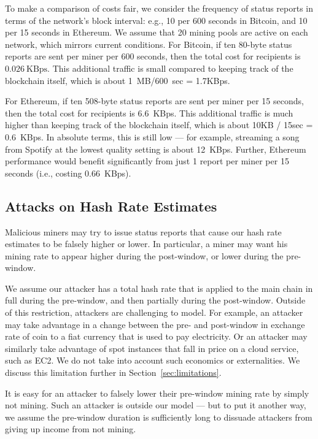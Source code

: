 \documentclass[10pt,sigconf]{acmart}
\newcommand{\para }[1]{\smallskip \noindent {\bf #1}}
\newcommand{\1}{{\em (i)}}
\newcommand{\2}{{\em (ii)}}
\newcommand{\3}{{\em (iii)}}
\newcommand{\4}{{\em (iv)}}
\newcommand{\5}{{\em (v)}}
\begin{document}
To make a comparison  of costs fair, we consider the frequency of status reports in terms of the network's block interval: e.g., 10 per 600 seconds in Bitcoin, and 10 per 15 seconds in Ethereum. We assume that 20 mining pools are active on each network, which mirrors current conditions. For Bitcoin, if ten 80-byte status reports are sent per miner per 600 seconds, then the total cost for recipients is 
$0.026~\mbox{KBps}$. This additional traffic is small compared to keeping track of the blockchain itself, which is about 1~MB/600~sec = 1.7KBps.

For Ethereum, if ten 508-byte status reports are sent per miner per 15 seconds, then the total cost for recipients is 6.6~KBps.  This additional traffic is much higher  than  keeping track of the blockchain itself, which is about 10KB / 15sec = 0.6~KBps. In absolute terms, this is still low --- for example, streaming a song from Spotify at the lowest quality setting is about 12~KBps. Further, Ethereum performance would benefit significantly from just 1 report per miner per 15 seconds (i.e., costing 0.66~KBps).


\subsection{Attacks on Hash Rate Estimates}
\label{sec:attacks-on}
Malicious miners may try to issue status reports that cause our hash rate estimates to be falsely higher or lower. 
In particular, a miner may want his mining rate to appear higher during the post-window, or lower during the pre-window. 


\para{Attacker Model.} We assume our attacker has a total hash rate that is applied to the main chain in full during the pre-window, and then partially during the post-window. Outside of this restriction, attackers are challenging to model.  For example, an attacker may take advantage in a  change between the pre- and post-window in exchange rate of coin to a fiat currency that is used to pay electricity. Or an attacker may similarly take advantage of spot instances that fall in price on a cloud service, such as EC2. We do not take into account such economics or externalities. We discuss this limitation further in Section~\ref{sec:limitations}.

It is easy for an attacker to falsely lower their pre-window mining rate by simply not mining. Such an attacker is outside our model --- but to put it another way, we assume the pre-window duration is sufficiently long to dissuade attackers from giving up income from not mining. 
\end{document}
